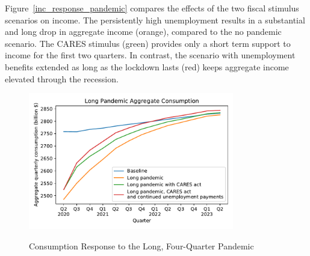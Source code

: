 \documentclass[titlepage]{\econtex}
\begin{document}
Figure~\ref{inc_response_pandemic} compares the effects of the two fiscal stimulus scenarios on income. 
The persistently high unemployment results in a substantial and long drop in aggregate income (orange), compared to the no pandemic scenario. 
The CARES stimulus (green) provides only a short term support to income for the first two quarters. 
In contrast, the scenario with unemployment benefits extended as long as the lockdown lasts (red) keeps aggregate income elevated through the recession.

\begin{figure}
  \centering
  \caption{Consumption Response to the Long, Four-Quarter Pandemic}
  \label{cons_response_pandemic}
  { \includegraphics[width=0.8\textwidth]{./Figures/DeepPandemic}}
\end{figure}
\end{document}
